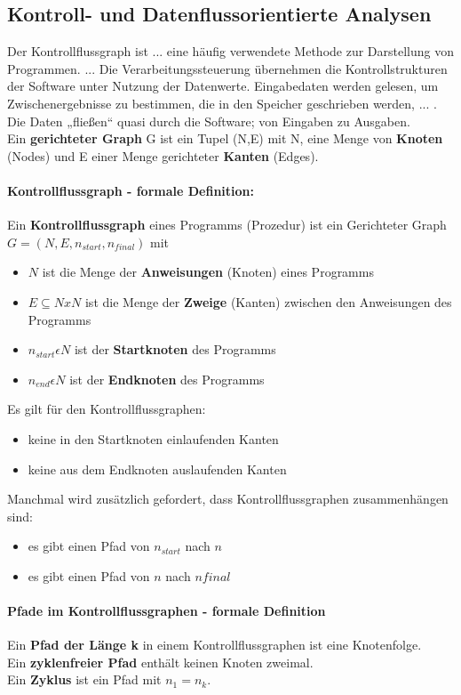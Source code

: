 \subsection{Kontroll- und Datenflussorientierte Analysen}
Der Kontrollflussgraph ist ... eine häufig verwendete Methode zur Darstellung von Programmen. ... Die Verarbeitungssteuerung übernehmen die Kontrollstrukturen der Software unter Nutzung der Datenwerte. Eingabedaten werden gelesen, um Zwischenergebnisse zu bestimmen, die in den Speicher geschrieben werden, ... . Die Daten „fließen“ quasi durch die Software; von Eingaben zu Ausgaben.
\\
Ein \textbf{gerichteter Graph} G ist ein Tupel (N,E) mit N, eine Menge von \textbf{Knoten} (Nodes) und E einer Menge gerichteter \textbf{Kanten} (Edges).

\paragraph{Kontrollflussgraph - formale Definition:}
Ein \textbf{Kontrollflussgraph} eines Programms (Prozedur) ist ein Gerichteter Graph $ G = (N, E, n_{start}, n_{final})$ mit 
\begin{itemize}
	\item $N$ ist die Menge der \textbf{Anweisungen} (Knoten) eines Programms
	\item $E \subseteq N x N$ ist die Menge der \textbf{Zweige} (Kanten) zwischen den Anweisungen des Programms
	\item $n_{start} \epsilon N $ ist der \textbf{Startknoten} des Programms
	\item $n_{end} \epsilon N $ ist der \textbf{Endknoten} des Programms
\end{itemize}
Es gilt für den Kontrollflussgraphen:
\begin{itemize}
	\item keine in den Startknoten einlaufenden Kanten
	\item keine aus dem Endknoten auslaufenden Kanten
\end{itemize}
Manchmal wird zusätzlich gefordert, dass Kontrollflussgraphen zusammenhängen sind:
\begin{itemize}
	\item es gibt einen Pfad von $n_{start}$ nach $n$
	\item es gibt einen Pfad von $n$ nach $n{final}$
\end{itemize}

\paragraph{Pfade im Kontrollflussgraphen - formale Definition}
Ein \textbf{Pfad der Länge k} in einem Kontrollflussgraphen ist eine Knotenfolge.
\\
Ein \textbf{zyklenfreier Pfad} enthält keinen Knoten zweimal.
\\
Ein \textbf{Zyklus} ist ein Pfad mit $n_{1} = n_{k}$.

